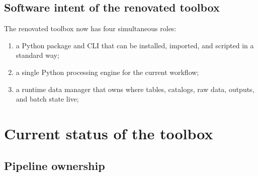 \documentclass[11pt,a4paper]{article}
\begin{document}
\subsection{Software intent of the renovated toolbox}

The renovated toolbox now has four simultaneous roles:

\begin{enumerate}[leftmargin=1.6em]
  \item a Python package and CLI that can be installed, imported, and scripted in a standard way;
  \item a single Python processing engine for the current workflow;
  \item a runtime data manager that owns where tables, catalogs, raw data, outputs, and batch state live;
\end{enumerate}

\section{Current status of the toolbox}

\subsection{Pipeline ownership}
\end{document}
